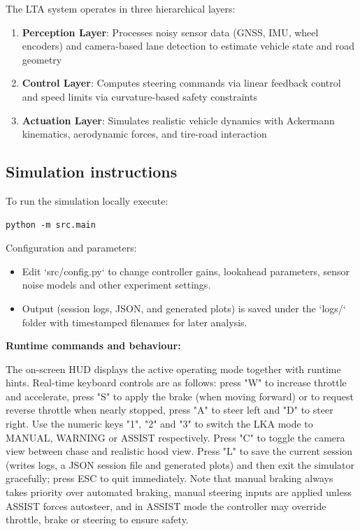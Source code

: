\documentclass[12pt]{article}
\begin{document}
The LTA system operates in three hierarchical layers:

\begin{enumerate}
    \item \textbf{Perception Layer}: Processes noisy sensor data (GNSS, IMU, wheel encoders) and camera-based lane detection to estimate vehicle state and road geometry
    \item \textbf{Control Layer}: Computes steering commands via linear feedback control and speed limits via curvature-based safety constraints
    \item \textbf{Actuation Layer}: Simulates realistic vehicle dynamics with Ackermann kinematics, aerodynamic forces, and tire-road interaction
\end{enumerate}

\subsection{Simulation instructions}
To run the simulation locally execute:
\begin{verbatim}
python -m src.main
\end{verbatim}

Configuration and parameters:
\begin{itemize}
    \item Edit `src/config.py` to change controller gains, lookahead parameters, sensor noise models and other experiment settings.
    \item Output (session logs, JSON, and generated plots) is saved under the `logs/` folder with timestamped filenames for later analysis.
\end{itemize}

\textbf{Runtime commands and behaviour:}

The on-screen HUD displays the active operating mode together with runtime hints. Real-time keyboard controls are as follows: press "W" to increase throttle and accelerate, press "S" to apply the brake (when moving forward) or to request reverse throttle when nearly stopped, press "A" to steer left and "D" to steer right. Use the numeric keys "1", "2" and "3" to switch the LKA mode to MANUAL, WARNING or ASSIST respectively. Press "C" to toggle the camera view between chase and realistic hood view. Press "L" to save the current session (writes logs, a JSON session file and generated plots) and then exit the simulator gracefully; press ESC to quit immediately. Note that manual braking always takes priority over automated braking, manual steering inputs are applied unless ASSIST forces autosteer, and in ASSIST mode the controller may override throttle, brake or steering to ensure safety.
\end{document}
